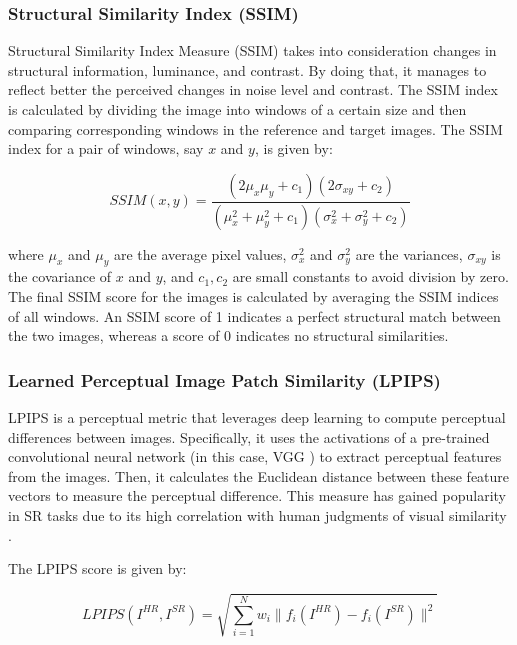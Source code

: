         \subsubsection{Structural Similarity Index (SSIM)}

            
        Structural Similarity Index Measure (SSIM) takes into consideration changes in structural information, luminance, and contrast. By doing that, it manages to reflect better the perceived changes in noise level and contrast.
        The SSIM index is calculated by dividing the image into windows of a certain size and then comparing corresponding windows in the reference and target images. The SSIM index for a pair of windows, say $x$ and $y$, is given by:
        
        \begin{equation}
            SSIM(x, y) = \frac{(2\mu_x\mu_y + c_1)(2\sigma_{xy} + c_2)}{(\mu_x^2 + \mu_y^2 + c_1)(\sigma_x^2 + \sigma_y^2 + c_2)}
        \end{equation}
        
        where $\mu_x$ and $\mu_y$ are the average pixel values, $\sigma_x^2$ and $\sigma_y^2$ are the variances, $\sigma_{xy}$ is the covariance of $x$ and $y$, and $c_1, c_2$ are small constants to avoid division by zero.
        The final SSIM score for the images is calculated by averaging the SSIM indices of all windows. An SSIM score of 1 indicates a perfect structural match between the two images, whereas a score of 0 indicates no structural similarities.

        \subsubsection{Learned Perceptual Image Patch Similarity (LPIPS)}

        LPIPS is a perceptual metric that leverages deep learning to compute perceptual differences between images. Specifically, it uses the activations of a pre-trained convolutional neural network (in this case, VGG \cite{VGGnet} ) to extract perceptual features from the images. 
        Then, it calculates the Euclidean distance between these feature vectors to measure the perceptual difference.
        This measure has gained popularity in SR tasks due to its high correlation with human judgments of visual similarity \cite{zhang2018unreasonable}.
        
        The LPIPS score is given by:
        
        \begin{equation}
        LPIPS(I^{HR}, I^{SR}) = \sqrt{\sum_{i=1}^{N} w_i\|f_i(I^{HR})-f_i(I^{SR})\|^2}
        \end{equation}
        
